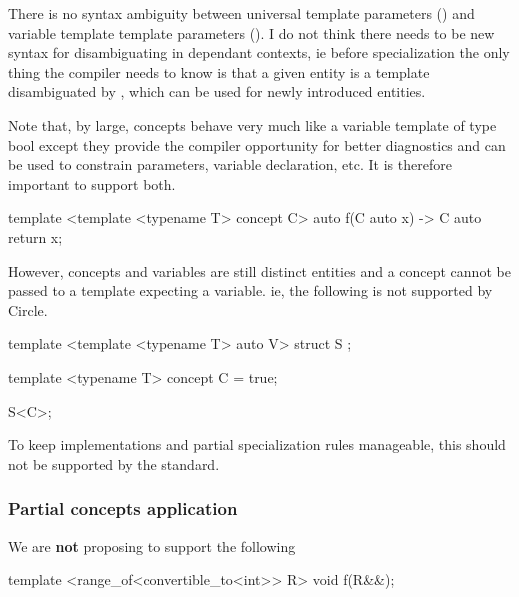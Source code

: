 \documentclass{wg21}
\begin{document}
There is no syntax ambiguity between universal template parameters () and variable template template parameters ().
I do not think there needs to be new syntax for disambiguating in dependant contexts, ie before specialization the only thing the compiler needs to know is that a given entity is a template disambiguated by , which can be used for newly introduced entities.


Note that, by large, concepts behave very much like a variable template of type bool except they provide the compiler opportunity for better diagnostics and can be used to constrain parameters, variable declaration, etc.
It is therefore important to support both.

\begin{colorblock}
template <template <typename T> concept C>
auto f(C auto x) -> C auto {
    return x;
}
\end{colorblock}

However, concepts and variables are still distinct entities and a concept cannot be passed to a template expecting a variable. ie, the following is not supported by Circle.
\begin{colorblock}
template <template <typename T> auto V>
struct S {};

template <typename T>
concept C = true;

S<C>;
\end{colorblock}

To keep implementations and partial specialization rules manageable, this should not be supported by the standard.

%

\subsubsection{Partial concepts application}

We are \textbf{not} proposing to support the following

\begin{colorblock}
template <range_of<convertible_to<int>> R> void f(R&&);
\end{colorblock}
\end{document}
